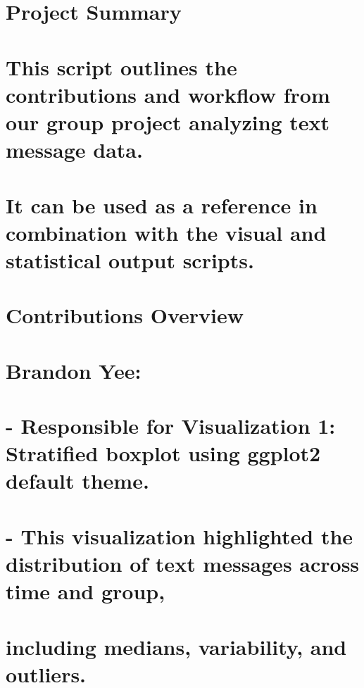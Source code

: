 \documentclass[
]{article}
\begin{document}
\section{Project Summary}\label{project-summary}

\section{This script outlines the contributions and workflow from our
group project analyzing text message
data.}\label{this-script-outlines-the-contributions-and-workflow-from-our-group-project-analyzing-text-message-data.}

\section{It can be used as a reference in combination with the visual
and statistical output
scripts.}\label{it-can-be-used-as-a-reference-in-combination-with-the-visual-and-statistical-output-scripts.}

\section{Contributions Overview}\label{contributions-overview}

\section{Brandon Yee:}\label{brandon-yee}

\section{- Responsible for Visualization 1: Stratified boxplot using
ggplot2 default
theme.}\label{responsible-for-visualization-1-stratified-boxplot-using-ggplot2-default-theme.}

\section{- This visualization highlighted the distribution of text
messages across time and
group,}\label{this-visualization-highlighted-the-distribution-of-text-messages-across-time-and-group}

\section{including medians, variability, and
outliers.}\label{including-medians-variability-and-outliers.}
\end{document}
